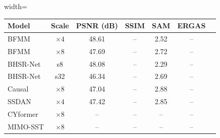 \documentclass[conference]{IEEEtran}
\begin{document}
\begin{table}[htbp]
\begin{center}
\begin{adjustbox}{width=\columnwidth}
\begin{tabular}{lcccccc}
\toprule
\textbf{Model} & \textbf{Scale} & \textbf{PSNR (dB)} & \textbf{SSIM} & \textbf{SAM} & \textbf{ERGAS} \\
\midrule
BFMM \cite{li2026bfmm} & $\times 4$ & 48.61 & -- & 2.52 & -- \\
BFMM \cite{li2026bfmm} & $\times 8$ & 47.69 & -- & 2.72 & -- \\
BHSR-Net \cite{dou2026bhsrnet} & s8 & 48.08 & -- & 2.29 & -- \\
BHSR-Net \cite{dou2026bhsrnet} & s32 & 46.34 & -- & 2.69 & -- \\
Causal \cite{liu2026causal} & $\times 8$ & 47.04 & -- & 2.88 & -- \\
SSDAN \cite{ssdan2026} & $\times 4$ & 47.42 & -- & 2.85 & -- \\
CYformer \cite{chen2025cyformer} & $\times 8$ & -- & -- & -- & -- \\
MIMO-SST \cite{fang2024mimosst} & $\times 8$ & -- & -- & -- & -- \\
\bottomrule
\end{tabular}
\end{adjustbox}
\label{tab:harvard}
\end{center}
\end{table}
\end{document}
